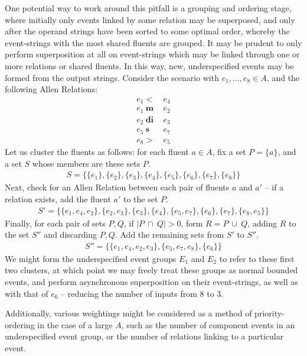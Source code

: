 \documentclass[a4paper,11pt,leqno]{article}
\begin{document}
One potential way to work around this pitfall is a grouping and ordering stage, 
where initially only events linked by some relation may be superposed, and only 
after the operand strings have been sorted to some optimal order, whereby the 
event-strings with the most shared fluents are grouped. It may be 
prudent to only perform superposition at all on event-strings which may be 
linked through one or more relations or shared fluents. In this way, new, 
underspecified events may be formed from the output strings. Consider the 
scenario with $e_1, \ldots, e_8 \in A$, and the following Allen 
Relations:
\begin{align*}
e_1 <& ~e_4\\
e_1 ~\mathbf{m}& ~e_2\\
e_2 ~\mathbf{di}& ~e_3\\
e_5 ~\mathbf{s}& ~e_7\\
e_8 >& ~e_5
\end{align*} 
Let us cluster the fluents as follows: for each fluent $a \in A$, fix a set $P 
= \{ a \}$, and a set $S$ whose members are these sets $P$.
\begin{align}
S = \{\{e_1\},\{e_2\},\{e_3\},\{e_4\},\{e_5\},\{e_6\},\{e_7\},\{e_8\}\}
\end{align}
Next, check for an Allen Relation between each pair of fluents $a$ and $a'$ -- 
if 
a relation exists, add the fluent $a'$ to the set $P$.
\begin{align}
S' = \{\{e_1, e_4, e_2\},\{e_2, e_3\}, \{e_3\}, \{e_4\}, \{e_5, e_7\}, \{e_6\}, 
\{e_7\}, \{e_8, e_5\}\}
\end{align}
Finally, for each pair of sets $P, Q$, if $|P ~\cap~ Q| > 0$, form $R = P 
~\cup~Q$, adding $R$ to the set $S''$ and discarding $P, Q$. Add the remaining 
sets 
from $S'$ to $S''$.
\begin{align}
S'' = \{\{e_1, e_4, e_2, e_3\}, \{e_5, e_7, e_8\}, \{e_6\}\}
\end{align}
We might form the underspecified event groups $E_1$ and 
$E_2$ to refer to these first two clusters, at which point we may freely treat 
these groups as normal bounded events, and perform asynchronous superposition 
on their event-strings, as well as with that of $e_6$ -- reducing the 
number of inputs from 8 to 3.

Additionally, various weightings might be considered as a method of 
priority-ordering in the case of a large $A$, such as the number of 
component events in an underspecified event group, or the number of relations 
linking to a particular event.
\end{document}

